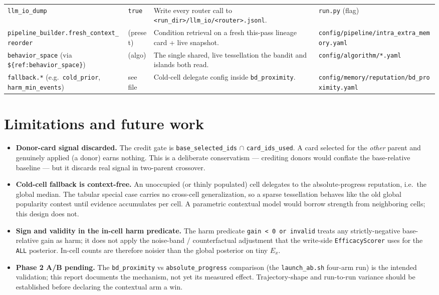 \documentclass[11pt]{article}
\newcommand{\code}[1]{\texttt{#1}}
\begin{document}
\begin{longtable}{>{\raggedright\arraybackslash}p{} >{\raggedright\arraybackslash}p{} >{\raggedright\arraybackslash}p{} >{\raggedright\arraybackslash}p{}}
\code{llm\_io\_dump} & \code{true} & Write every router call to
\code{<run\_dir>/llm\_io/<router>.jsonl}. & \code{run.py} (flag) \\
\code{pipeline\_builder.fresh\_context\_reorder} & (preset) & Condition retrieval
on a fresh this-pass lineage card + live snapshot. &
\code{config/pipeline/intra\_extra\_memory.yaml} \\
\code{behavior\_space} (via \code{\$\{ref:behavior\_space\}}) & (algo) & The single
shared, live tessellation the bandit and islands both read. &
\code{config/algorithm/*.yaml} \\
\code{fallback.*} (e.g.\ \code{cold\_prior}, \code{harm\_min\_events}) & see file &
Cold-cell delegate config inside \code{bd\_proximity}. &
\code{config/memory/reputation/bd\_proximity.yaml} \\
\bottomrule
\end{longtable}
\endgroup

\section{Limitations and future work}

\begin{itemize}[leftmargin=2em,itemsep=3pt]
\item \textbf{Donor-card signal discarded.} The credit gate is
\code{base\_selected\_ids} $\cap$ \code{card\_ids\_used}. A card selected for the
\emph{other} parent and genuinely applied (a donor) earns nothing. This is a
deliberate conservatism --- crediting donors would conflate the base-relative
baseline --- but it discards real signal in two-parent crossover.
\item \textbf{Cold-cell fallback is context-free.} An unoccupied (or thinly
populated) cell delegates to the absolute-progress reputation, i.e.\ the global
median. The tabular special case carries no cross-cell generalization, so a sparse
tessellation behaves like the old global popularity contest until evidence
accumulates per cell. A parametric contextual model would borrow strength from
neighboring cells; this design does not.
\item \textbf{Sign and validity in the in-cell harm predicate.} The harm predicate
\code{gain < 0 or invalid} treats any strictly-negative base-relative gain as harm;
it does not apply the noise-band / counterfactual adjustment that the write-side
\code{EfficacyScorer} uses for the \code{ALL} posterior. In-cell counts are
therefore noisier than the global posterior on tiny $E_x$.
\item \textbf{Phase 2 A/B pending.} The \code{bd\_proximity} vs
\code{absolute\_progress} comparison (the \code{launch\_ab.sh} four-arm run) is the
intended validation; this report documents the mechanism, not yet its measured
effect. Trajectory-shape and run-to-run variance should be established before
declaring the contextual arm a win.
\end{itemize}
\end{document}
